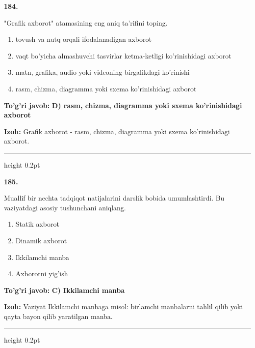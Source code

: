 \documentclass[10pt,a4paper,oneside]{article}
\begin{document}
\noindent\textbf{\color{ink}184.}
\par
"Grafik axborot" atamasining eng aniq ta'rifini toping.
\begin{enumerate}[label=\Alph*),leftmargin=9mm]
\item tovush va nutq orqali ifodalanadigan axborot
\item vaqt bo'yicha almashuvchi tasvirlar ketma-ketligi ko'rinishidagi axborot
\item matn, grafika, audio yoki videoning birgalikdagi ko'rinishi
\item rasm, chizma, diagramma yoki sxema ko'rinishidagi axborot
\end{enumerate}
\begin{tcolorbox}[enhanced,breakable,colback=teal!4,colframe=teal!50!black,boxrule=0.5pt,arc=1.1mm,left=3mm,right=3mm,top=1.7mm,bottom=1.7mm,before skip=2mm,after skip=2mm]
\textbf{\color{teal}To'g'ri javob:} \textbf{D) rasm, chizma, diagramma yoki sxema ko'rinishidagi axborot}
\par\smallskip
\textbf{Izoh:} Grafik axborot - rasm, chizma, diagramma yoki sxema ko'rinishidagi axborot.
\end{tcolorbox}
\vspace{2mm}\hrule height 0.2pt \vspace{3mm}

\noindent\textbf{\color{ink}185.}
\par
Muallif bir nechta tadqiqot natijalarini darslik bobida umumlashtirdi. Bu vaziyatdagi asosiy tushunchani aniqlang.
\begin{enumerate}[label=\Alph*),leftmargin=9mm]
\item Statik axborot
\item Dinamik axborot
\item Ikkilamchi manba
\item Axborotni yig'ish
\end{enumerate}
\begin{tcolorbox}[enhanced,breakable,colback=teal!4,colframe=teal!50!black,boxrule=0.5pt,arc=1.1mm,left=3mm,right=3mm,top=1.7mm,bottom=1.7mm,before skip=2mm,after skip=2mm]
\textbf{\color{teal}To'g'ri javob:} \textbf{C) Ikkilamchi manba}
\par\smallskip
\textbf{Izoh:} Vaziyat Ikkilamchi manbaga misol: birlamchi manbalarni tahlil qilib yoki qayta bayon qilib yaratilgan manba.
\end{tcolorbox}
\vspace{2mm}\hrule height 0.2pt \vspace{3mm}
\end{document}
